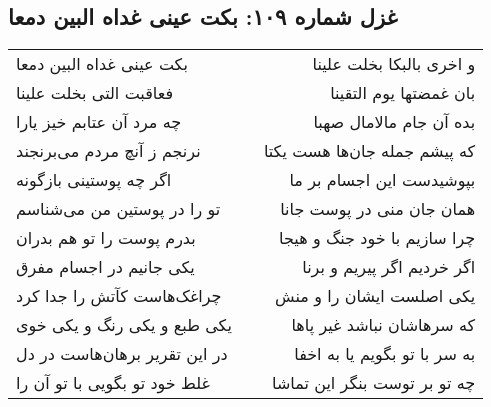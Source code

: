 \begin{center}
\section*{غزل شماره ۱۰۹: بکت عینی غداه البین دمعا}
\label{sec:0109}
\begin{longtable}{l p{0.5cm} r}
بکت عینی غداه البین دمعا
&&
و اخری بالبکا بخلت علینا
\\
فعاقبت التی بخلت علینا
&&
بان غمضتها یوم التقینا
\\
چه مرد آن عتابم خیز یارا
&&
بده آن جام مالامال صهبا
\\
نرنجم ز آنچ مردم می‌برنجند
&&
که پیشم جمله جان‌ها هست یکتا
\\
اگر چه پوستینی بازگونه
&&
بپوشیدست این اجسام بر ما
\\
تو را در پوستین من می‌شناسم
&&
همان جان منی در پوست جانا
\\
بدرم پوست را تو هم بدران
&&
چرا سازیم با خود جنگ و هیجا
\\
یکی جانیم در اجسام مفرق
&&
اگر خردیم اگر پیریم و برنا
\\
چراغک‌هاست کآتش را جدا کرد
&&
یکی اصلست ایشان را و منش
\\
یکی طبع و یکی رنگ و یکی خوی
&&
که سرهاشان نباشد غیر پاها
\\
در این تقریر برهان‌هاست در دل
&&
به سر با تو بگویم یا به اخفا
\\
غلط خود تو بگویی با تو آن را
&&
چه تو بر توست بنگر این تماشا
\\
\end{longtable}
\end{center}
